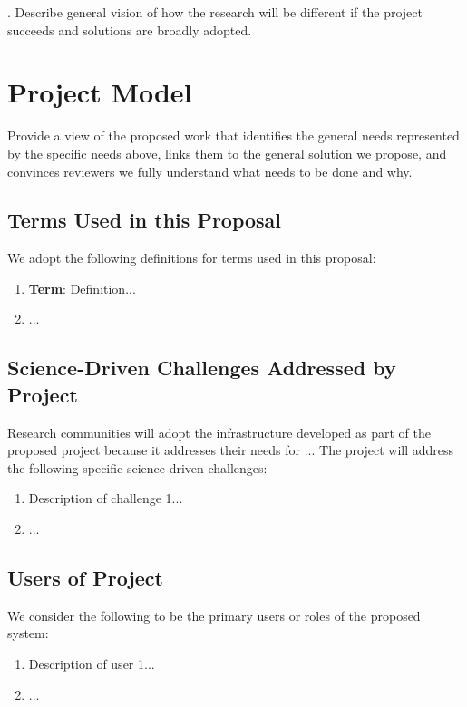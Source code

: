 . Describe general vision of how the research will be different if the project succeeds and solutions are broadly adopted.

\section{Project Model}

Provide a view of the proposed work that identifies the general needs represented by the specific needs above, links them to the general solution we propose, and convinces reviewers we fully understand what needs to be done and why.

\subsection{Terms Used in this Proposal}
We adopt the following definitions for terms used in this proposal:
\begin{enumerate}
\item {\bf Term}: Definition...
\item ...
\end{enumerate}

\subsection{Science-Driven Challenges Addressed by Project}
Research communities will adopt the infrastructure developed as part of the proposed project because it addresses their needs for ... The project will address the following specific science-driven challenges:

\begin{enumerate}[label={\bf C\arabic*.},start=1]
\item Description of challenge 1...
\item ...
\end{enumerate}

\subsection{Users of Project}
We consider the following to be the primary users or roles of the proposed system:
\begin{enumerate}[label={\bf U\arabic*.},start=1]
\item Description of user 1...
\item ...
\end{enumerate}

